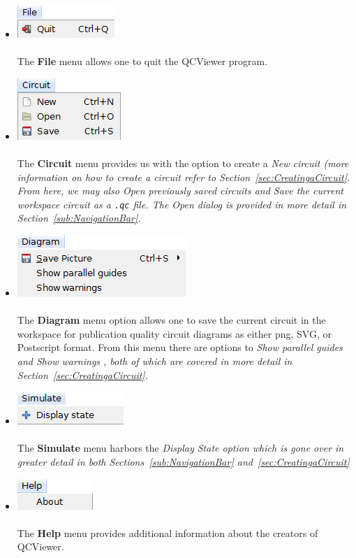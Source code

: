 \documentclass[10pt]{article}
\theoremstyle{definition}
\begin{document}
\begin{itemize}
\item \includegraphics{Figures/Menu/File.png} \\ \\
The {\bf File} menu allows one to quit the QCViewer program.

\item \includegraphics{Figures/Menu/Circuit.png} \\ \\
The {\bf Circuit} menu provides us with the option to create a \em New \em circuit (more information on how to create a circuit refer to  Section~\ref{sec:CreatingaCircuit}. From here, we may also \em Open \em previously saved circuits and \em Save \em the current workspace circuit as a \verb+.qc+ file. The \em Open \em dialog is provided in more detail in Section~\ref{sub:NavigationBar}.

\item \includegraphics{Figures/Menu/Diagram.png} \\ \\ 
The {\bf Diagram} menu option allows one to save the current circuit in the workspace for publication quality circuit diagrams as either png, SVG, or Postscript format. From this menu there are options to \em Show parallel guides \em and \em Show warnings \em, both of which are covered in more detail in Section~\ref{sec:CreatingaCircuit}.
 
\item \includegraphics{Figures/Menu/Simulate.png} \\ \\
The {\bf Simulate} menu harbors the \em Display State \em option which is gone over in greater detail in both Sections~\ref{sub:NavigationBar} and~\ref{sec:CreatingaCircuit}


\item \includegraphics{Figures/Menu/Help.png} \\ \\
The {\bf Help} menu provides additional information about the creators of QCViewer. 

\end{itemize}
\end{document}
